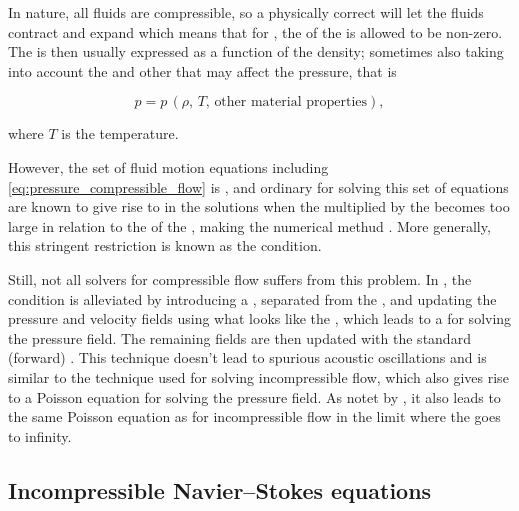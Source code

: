 In nature, all fluids are compressible, so a physically correct  will let the fluids contract and expand which means that for , the \divergence of the  is allowed to be non-zero. The \pressure is then usually expressed as a function of the density; sometimes also taking into account the \temperature and other \properties that may affect the pressure, that is

\begin{equation} \label{eq:pressure_compressible_flow}
p = p\,(\rho,\,T,\,\text{other material properties}),
\end{equation}

where $T$ is the temperature.

However, the set of fluid motion equations including \eqref{eq:pressure_compressible_flow} is , and ordinary  for solving this set of equations are known to give rise to  in the solutions when the  multiplied by the  becomes too large in relation to the  of the \cells, making the numerical methud \unstable. More generally, this stringent restriction is known as the \CFL condition.

Still, not all solvers for compressible flow suffers from this problem. In \citep{Kwatra2009}, the \CFL condition is alleviated by introducing a , separated from the , and updating the pressure and velocity fields using what looks like the , which leads to a  for solving the pressure field. The remaining fields are then updated with the standard (forward) . This technique doesn't lead to spurious acoustic oscillations and is similar to the technique used for solving incompressible flow, which also gives rise to a Poisson equation for solving the pressure field. As notet by \citep{Kwatra2009}, it also leads to the same Poisson equation as for incompressible flow in the limit where the  goes to infinity.

\subsection{Incompressible Navier--Stokes equations}

